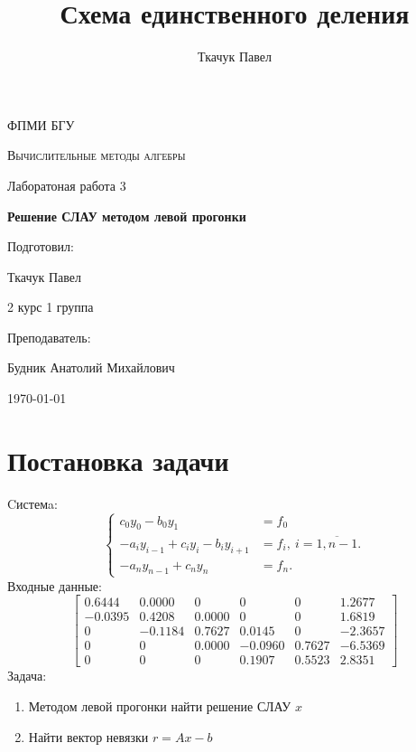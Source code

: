 \documentclass[11.4pt]{article}
\author{Ткачук Павел}
\title{Схема единственного деления}
\begin{document}
	\begin{titlepage}
		
		\centering
		{\scshape\LARGE ФПМИ БГУ \par}
		\vfill
		\begin{flushleft}
		{\scshape\Large Вычислительные методы алгебры\par Лаборатоная работа 3 \par}
		\vspace{1cm}
		{\huge\bfseries Решение СЛАУ методом левой прогонки\par}
		\end{flushleft}
		\vspace{10cm}
		\begin{flushright}
		\large
		Подготовил:\par
		Ткачук Павел\par
		2 курс 1 группа\par
		\vspace{0.5cm}
		Преподаватель:\par
		Будник Анатолий Михайлович
		\end{flushright}
		
		\vfill
		{\large \today}
	\end{titlepage}
\section{Постановка задачи}
	Cистемa:
	\begin{equation}
		\left\{
			\begin{aligned}
				 c_0 y_0 - b_0 y_1&=f_0\\
				 -a_iy_{i-1}+c_iy_i-b_iy_{i+1}&=f_i, \: i= \overline{1, n-1}.\\
				 -a_n y_{n-1} + c_ny_n&=f_n.
			\end{aligned}
		\right.
	\end{equation}
	Входные данные:
	\[
		\left[
			\begin{array}{ccccc|c}
				0.6444 & 0.0000 & 0 & 0 & 0 & 1.2677\\
			   -0.0395 & 0.4208 & 0.0000 & 0 & 0 & 1.6819\\
			   0 & -0.1184 & 0.7627 & 0.0145 & 0 & -2.3657\\
			    0 & 0 & 0.0000 & -0.0960 & 0.7627 & -6.5369\\
			    0 & 0 & 0 & 0.1907 & 0.5523 & 2.8351
			\end{array}
		\right]
	\]
	Задача:
	\begin{enumerate}
		\item Методом левой прогонки найти решение СЛАУ $x$
		\item Найти вектор невязки $r = Ax-b$
	\end{enumerate}
\end{document}
